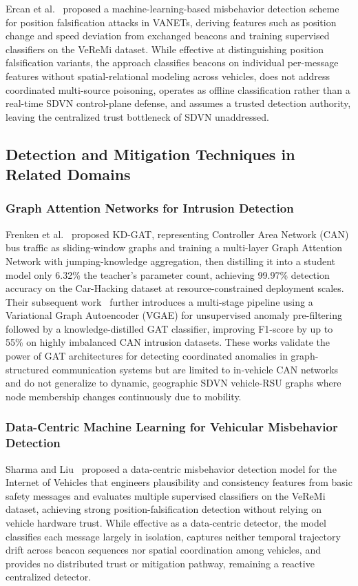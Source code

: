 \documentclass[12pt, a4paper]{report}
\begin{document}
Ercan et al.~\cite{ercan2022misbehavior} proposed a machine-learning-based
misbehavior detection scheme for position falsification attacks in VANETs,
deriving features such as position change and speed deviation from
exchanged beacons and training supervised classifiers on the VeReMi
dataset. While effective at distinguishing position falsification
variants, the approach classifies beacons on individual per-message
features without spatial-relational modeling across vehicles, does not
address coordinated multi-source poisoning, operates as offline
classification rather than a real-time SDVN control-plane defense, and
assumes a trusted detection authority, leaving the centralized trust
bottleneck of SDVN unaddressed.


\subsection{Detection and Mitigation Techniques in Related Domains}
\label{sec:related_techniques}

\subsubsection{Graph Attention Networks for Intrusion Detection}
Frenken et al.~\cite{frenken2025kdgat} proposed KD-GAT, representing
Controller Area Network (CAN) bus traffic as sliding-window graphs and
training a multi-layer Graph Attention Network with jumping-knowledge
aggregation, then distilling it into a student model only 6.32\% the
teacher's parameter count, achieving 99.97\% detection accuracy on the
Car-Hacking dataset at resource-constrained deployment scales. Their
subsequent work~\cite{frenken2025multistage} further introduces a
multi-stage pipeline using a Variational Graph Autoencoder (VGAE) for
unsupervised anomaly pre-filtering followed by a knowledge-distilled GAT
classifier, improving F1-score by up to 55\% on highly imbalanced CAN
intrusion datasets. These works validate the power of GAT architectures
for detecting coordinated anomalies in graph-structured communication
systems but are limited to in-vehicle CAN networks and do not generalize
to dynamic, geographic SDVN vehicle-RSU graphs where node membership
changes continuously due to mobility.

\subsubsection{Data-Centric Machine Learning for Vehicular Misbehavior Detection}
Sharma and Liu~\cite{sharma2021machine} proposed a data-centric
misbehavior detection model for the Internet of Vehicles that engineers
plausibility and consistency features from basic safety messages and
evaluates multiple supervised classifiers on the VeReMi dataset,
achieving strong position-falsification detection without relying on
vehicle hardware trust. While effective as a data-centric detector, the
model classifies each message largely in isolation, captures neither
temporal trajectory drift across beacon sequences nor spatial
coordination among vehicles, and provides no distributed trust or
mitigation pathway, remaining a reactive centralized detector.
\end{document}
